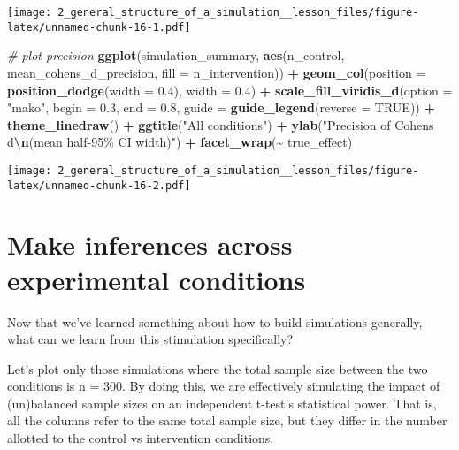 \documentclass[
]{article}
\newenvironment{Shaded}{\begin{snugshade}}{\end{snugshade}}
\newcommand{\AttributeTok}[1]{\textcolor[rgb]{0.13,0.29,0.53}{#1}}
\newcommand{\CommentTok}[1]{\textcolor[rgb]{0.56,0.35,0.01}{\textit{#1}}}
\newcommand{\ConstantTok}[1]{\textcolor[rgb]{0.56,0.35,0.01}{#1}}
\newcommand{\FloatTok}[1]{\textcolor[rgb]{0.00,0.00,0.81}{#1}}
\newcommand{\FunctionTok}[1]{\textcolor[rgb]{0.13,0.29,0.53}{\textbf{#1}}}
\newcommand{\NormalTok}[1]{#1}
\newcommand{\SpecialCharTok}[1]{\textcolor[rgb]{0.81,0.36,0.00}{\textbf{#1}}}
\newcommand{\StringTok}[1]{\textcolor[rgb]{0.31,0.60,0.02}{#1}}
\begin{document}
\texttt{[image: 2\_general\_structure\_of\_a\_simulation\_\_lesson\_files/figure-latex/unnamed-chunk-16-1.pdf]}

\begin{Shaded}
\begin{Highlighting}[]
\CommentTok{\# plot precision}
\FunctionTok{ggplot}\NormalTok{(simulation\_summary, }\FunctionTok{aes}\NormalTok{(n\_control, mean\_cohens\_d\_precision, }\AttributeTok{fill =}\NormalTok{ n\_intervention)) }\SpecialCharTok{+}
  \FunctionTok{geom\_col}\NormalTok{(}\AttributeTok{position =} \FunctionTok{position\_dodge}\NormalTok{(}\AttributeTok{width =} \FloatTok{0.4}\NormalTok{), }\AttributeTok{width =} \FloatTok{0.4}\NormalTok{) }\SpecialCharTok{+}
  \FunctionTok{scale\_fill\_viridis\_d}\NormalTok{(}\AttributeTok{option =} \StringTok{"mako"}\NormalTok{, }\AttributeTok{begin =} \FloatTok{0.3}\NormalTok{, }\AttributeTok{end =} \FloatTok{0.8}\NormalTok{, }
                       \AttributeTok{guide =} \FunctionTok{guide\_legend}\NormalTok{(}\AttributeTok{reverse =} \ConstantTok{TRUE}\NormalTok{)) }\SpecialCharTok{+}
  \FunctionTok{theme\_linedraw}\NormalTok{() }\SpecialCharTok{+}
  \FunctionTok{ggtitle}\NormalTok{(}\StringTok{"All conditions"}\NormalTok{) }\SpecialCharTok{+}
  \FunctionTok{ylab}\NormalTok{(}\StringTok{"Precision of Cohen\textquotesingle{}s d}\SpecialCharTok{\textbackslash{}n}\StringTok{(mean half{-}95\% CI width)"}\NormalTok{) }\SpecialCharTok{+}
  \FunctionTok{facet\_wrap}\NormalTok{(}\SpecialCharTok{\textasciitilde{}}\NormalTok{ true\_effect)}
\end{Highlighting}
\end{Shaded}

\texttt{[image: 2\_general\_structure\_of\_a\_simulation\_\_lesson\_files/figure-latex/unnamed-chunk-16-2.pdf]}

\hypertarget{make-inferences-across-experimental-conditions}{%
\section{Make inferences across experimental
conditions}\label{make-inferences-across-experimental-conditions}}

Now that we've learned something about how to build simulations
generally, what can we learn from this stimulation specifically?

Let's plot only those simulations where the total sample size between
the two conditions is n = 300. By doing this, we are effectively
simulating the impact of (un)balanced sample sizes on an independent
t-test's statistical power. That is, all the columns refer to the same
total sample size, but they differ in the number allotted to the control
vs intervention conditions.
\end{document}
